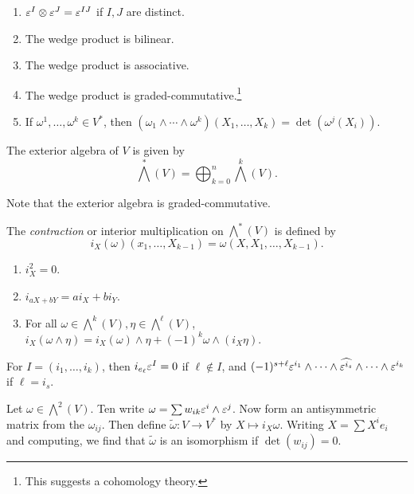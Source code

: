 \documentclass[twoside, 10pt]{article}
\begin{document}
    \begin{prop}
        \begin{enumerate}
            \item $\varepsilon^I \otimes \varepsilon^J = \varepsilon^{IJ}$ if $I,J$ are distinct.
            \item The wedge product is bilinear.
            \item The wedge product is associative.
            \item The wedge product is graded-commutative.\footnote{This suggests a cohomology theory.}
            \item If $\omega^1, \ldots, \omega^k \in V^*$, then $(\omega_1 \wedge \cdots \wedge \omega^k)(X_1, \ldots, X_k) = \det(\omega^j(X_i))$.
        \end{enumerate}
    \end{prop}

    \begin{defn}
        The exterior algebra of $V$ is given by
        \[ \bigwedge^*(V) = \bigoplus_{k=0}^n \bigwedge^k(V).\]
    \end{defn}
    Note that the exterior algebra is graded-commutative.

    \begin{defn}
        The \textit{contraction} or interior multiplication on $\bigwedge^*(V)$ is defined by
        \[ i_X(\omega)(x_1, \ldots, X_{k-1}) = \omega(X,X_1, \ldots, X_{k-1}). \]
    \end{defn}

    \begin{lem}
        \begin{enumerate}
            \item $i_X^2 = 0$.
            \item $i_{aX+bY} = ai_X + bi_Y$.
            \item For all $\omega \in \bigwedge^k(V), \eta \in \bigwedge^{\ell}(V)$, $i_X(\omega \wedge \eta) = i_X(\omega) \wedge \eta + (-1)^{k} \omega \wedge (i_X \eta)$.
        \end{enumerate}
    \end{lem}

    \begin{exm}
        For $I = (i_1, \ldots, i_k)$, then $i_{e_\ell} \varepsilon^I = 0$ if $\ell \notin I$, and $(-1)^{s+\ell} \varepsilon^{i_1} \wedge \cdots \wedge \widehat{\varepsilon^{i_s}} \wedge \cdots \wedge \varepsilon^{i_k}$ if $\ell = i_s$.
    \end{exm}

    \begin{exm}
        Let $\omega \in \bigwedge^2(V)$. Ten write $\omega = \sum w_{ik} \varepsilon^i \wedge \varepsilon^j$. Now form an antisymmetric matrix from the $\omega_{ij}$. Then define $\widetilde{\omega}:V \to V^*$ by $X \mapsto i_X \omega$. Writing $X = \sum X^ie_i$ and computing, we find that $\widetilde{\omega}$ is an isomorphism if $\det (w_{ij}) = 0$.
    \end{exm}
\end{document}

